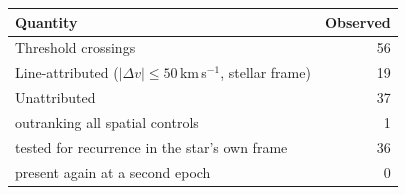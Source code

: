 \begin{tabular}{@{}lr@{}}
\hline
Quantity & Observed \\
\hline
Threshold crossings & 56 \\
Line-attributed ($|\Delta v|\leq50$\,km\,s$^{-1}$, stellar frame) & 19 \\
Unattributed & 37 \\
\quad outranking all spatial controls & 1 \\
\quad tested for recurrence in the star's own frame & 36 \\
\quad present again at a second epoch & 0 \\
\hline
\end{tabular}
